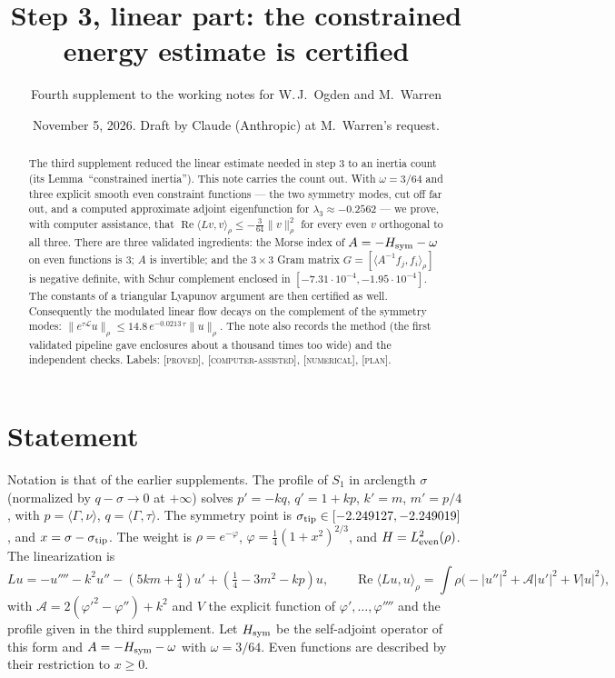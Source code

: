 \documentclass[11pt]{amsart}
\title{Step 3, linear part: the constrained energy estimate is certified}
\author{Fourth supplement to the working notes for W.\,J.~Ogden and M.~Warren}
\date{November 5, 2026. Draft by Claude (Anthropic) at M.~Warren's request.}
\theoremstyle{definition}
\theoremstyle{remark}
\newcommand{\ip}[2]{\langle #1,#2\rangle}
\newcommand{\re}{\operatorname{Re}}
\newcommand{\lab}[1]{\textup{\textsc{[#1]}}}
\newcommand{\stip}{\sigma_{\rm tip}}
\begin{document}
\begin{abstract}
The third supplement reduced the linear estimate needed in step 3 to an inertia count (its Lemma~``constrained inertia''). This note carries the count out. With $\omega=3/64$ and three explicit smooth even constraint functions --- the two symmetry modes, cut off far out, and a computed approximate adjoint eigenfunction for $\lambda_3\approx-0.2562$ --- we prove, with computer assistance, that $\re\ip{Lv}{v}_\rho\le-\frac{3}{64}\|v\|_\rho^2$ for every even $v$ orthogonal to all three. There are three validated ingredients: the Morse index of $A=-H_{\rm sym}-\omega$ on even functions is $3$; $A$ is invertible; and the $3\times3$ Gram matrix $G=[\ip{A^{-1}f_j}{f_i}_\rho]$ is negative definite, with Schur complement enclosed in $[-7.31\cdot10^{-4},-1.95\cdot10^{-4}]$. The constants of a triangular Lyapunov argument are then certified as well. Consequently the modulated linear flow decays on the complement of the symmetry modes: $\|e^{\tau\mathcal L}u\|_\rho\le14.8\,e^{-0.0213\,\tau}\|u\|_\rho$. The note also records the method (the first validated pipeline gave enclosures about a thousand times too wide) and the independent checks. Labels: \lab{proved}, \lab{computer-assisted}, \lab{numerical}, \lab{plan}.
\end{abstract}
\maketitle

\section{Statement}

Notation is that of the earlier supplements. The profile of $S_1$ in arclength $\sigma$ (normalized by $q-\sigma\to0$ at $+\infty$) solves $p'=-kq$, $q'=1+kp$, $k'=m$, $m'=p/4$, with $p=\ip{\Gamma}{\nu}$, $q=\ip{\Gamma}{\tau}$. The symmetry point is $\stip\in[-2.249127,-2.249019]$, and $x=\sigma-\stip$. The weight is $\rho=e^{-\varphi}$, $\varphi=\frac14(1+x^2)^{2/3}$, and $H=L^2_{\rm even}(\rho)$. The linearization is
\[
Lu=-u''''-k^2u''-(5km+\tfrac q4)u'+(\tfrac14-3m^2-kp)u,
\qquad \re\ip{Lu}{u}_\rho=\int\rho\big(-|u''|^2+\mathcal A|u'|^2+V|u|^2\big),
\]
with $\mathcal A=2(\varphi'^2-\varphi'')+k^2$ and $V$ the explicit function of $\varphi',\dots,\varphi''''$ and the profile given in the third supplement. Let $H_{\rm sym}$ be the self-adjoint operator of this form and $A=-H_{\rm sym}-\omega$ with $\omega=3/64$. Even functions are described by their restriction to $x\ge0$.
\end{document}
